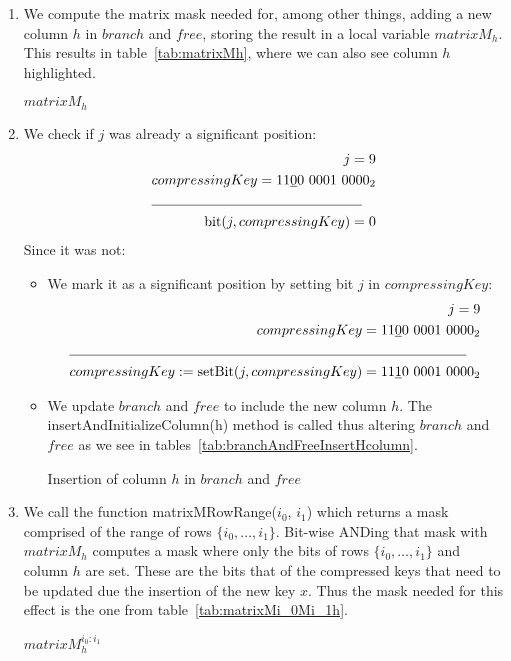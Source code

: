 \begin{enumerate}
    \item
    We compute the matrix mask needed for, among other things, adding a new column $h$ in $branch$ and $free$, storing the result in a local variable $matrixM_h$. This results in table~\ref{tab:matrixMh}, where we can also see column $h$ highlighted.
    \begin{table}[H]
    \centering
    
    \caption{$matrixM_h$}
    \label{tab:matrixMh}
    \end{table}
    
    \item
    We check if $j$ was already a significant position:
    \begin{align*}
        j = 9 \\
        compressingKey = 11\underline{0}0\ 0001\ 0000_2 \\
        \cline{1-2}
        \text{bit}(j, compressingKey) = 0
    \end{align*}
    Since it was not:
    \begin{itemize}
        \item
        We mark it as a significant position by setting bit $j$ in $compressingKey$:
        \begin{align*}
            j = 9 \\
            compressingKey = 11\underline{0}0\ 0001\ 0000_2\\
            \cline{1-2}
             compressingKey := \text{setBit}(j, compressingKey) = 11\underline{1}0\ 0001\ 0000_2
        \end{align*}
        
        \item
        We update $branch$ and $free$ to include the new column $h$. The {\ttfamily insertAndInitializeColumn(h)} method is called thus altering $branch$ and $free$ as we see in tables~\ref{tab:branchAndFreeInsertHcolumn}.
        \begin{table}[H]
        \centering
        
        \caption{Insertion of column $h$ in $branch$ and $free$}
        \label{tab:branchAndFreeInsertHcolumn}
        \end{table}
    \end{itemize}

    \item
    We call the function {\ttfamily matrixMRowRange($i_0$, $i_1$)} which returns a mask comprised of the range of rows $\{ i_0, \dots, i_1 \}$. Bit-wise ANDing that mask with $matrixM_h$ computes a mask where only the bits of rows $\{ i_0, \dots, i_1 \}$ and column $h$ are set. These are the bits that of the compressed keys that need to be updated due the insertion of the new key $x$. Thus the mask needed for this effect is the one from table~\ref{tab:matrixMi_0Mi_1h}.
    \begin{table}[H]
    \centering
    
    \caption{$matrixM^{i_0:i_1}_h$}
    \label{tab:matrixMi_0Mi_1h}
    \end{table}
    

\end{enumerate}
